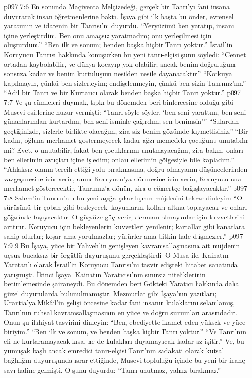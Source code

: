 \vs p097 7:6 En sonunda Maçiventa Melçizedeği, gerçek bir Tanrı’yı fani insana duyurarak insan öğretmenlerine baktı. İşaya gibi ilk başta bu önder, evrensel yaratımın ve idarenin bir Tanrısı’nı duyurdu. “Yeryüzünü ben yaratıp, insanı içine yerleştirdim. Ben onu amaçsız yaratmadım; onu yerleşilmesi için oluşturdum.” “Ben ilk ve sonum; benden başka hiçbir Tanrı yoktur.” İsrail’in Koruyucu Tanrısı hakkında konuşurken bu yeni tanrı\hyp{}elçisi şunu söyledi: “Cennet ortadan kaybolabilir, ve dünya kocayıp yok olabilir; ancak benim doğruluğum sonsuza kadar ve benim kurtuluşum nesilden nesile dayanacaktır.” “Korkuya kapılmayın, çünkü ben sizlerleyim; endişelenmeyin, çünkü ben sizin Tanrınız’ım.” “Adil bir Tanrı ve bir Kurtarıcı olarak benden başka hiçbir Tanrı yoktur.”
\vs p097 7:7 Ve şu cümleleri duymak, tıpkı bu dönemden beri binlercesine olduğu gibi, Musevi esirlerine huzur vermişti: “Tanrı söyle söyler, ‘ben seni yarattım, ben seni günahlarından kurtardım, ben seni isminle çağırdım; sen benimsin’” “Sulardan geçtiğinizde, sizlerle birlikte olacağım, zira siz benim gözümde kıymetlisiniz.” “Bir kadın, oğluna merhamet göstermeyecek kadar ağzı memedeki çocuğunu unutabilir mi? Evet, o unutabilir, fakat ben çocuklarımı unutmayacağım, zira bakın, onları ben ellerimin avuçları içine işledim; onları ellerimin gölgesiyle bile kapladım.” “Ahlaksız olanın tercih ettiği yolu bırakmasına, doğru olmayanın düşüncelerinden vazgeçmesine izin verin, onun Koruyucu’ya dönmesine izin verin, Koruyucu ona merhamet gösterecektir, Tanrımız’a dönün, zira o cömertçe bağışlayacaktır.”
\vs p097 7:8 Salem’in Tanrısı’nın bu yeni açığa çıkarılışının müjdesini tekrar dinleyin: “O sürüsünü bir çoban gibi besleyecek; koyunlarını kolları altına toplayacak ve onları göğsünde taşıyacaktır. O güçsüze güç verir, dermanı olmayanlar için kuvvetlerini arttırır. Koruyucu için bekleyenlerin kuvvetleri yenilenir; kartallar gibi kanatlara sahip olurlar; koşar ama yorulmazlar; yürürler ama bitkin hale düşmezler.”
\vs p097 7:9 9 Bu İşaya, yüce bir Yahveh’in genişleyen kavramsallaşmasına ait müjdenin uçsuz bucaksız bir örgütlü duyuruşunu gerçekleştirdi. O Musa ile, Kainatın Yaratan’ı olarak İsrail’in Koruyucu Tanrısı’nı tasvir edişteki hitabet sanatında yarışmıştı. İkinci İşaya, Kainatın Yaratıcısı’nın sınırsız niteliklerinin betimlemesinde şairaneydi. Bu dönemden beri Gökteki Yaratıcı hakkında daha güzel duyurularda bulunulmamıştır. Mezmurlar gibi İşaya’nın yazıtları; Urantia’ya Mikâil’in gelişi öncesine kadar fani insanın kulaklarını selamlamış, Tanrı’nın ruhsal kavramsallaşmasının en yüce ve doğru sunumları arasındadır. Onun şu ilahiyat tasvirini dinleyin: “Ben, ebediyette ikamet eden yüksek ve yüce biriyim.” “Ben ilk ve sonum, ve benden başka hiçbir Tanrı yoktur.” “Ve Tanrı’nın eli ne kurtaramayacak kısa, ne de kulakları duyamayacak kadar az işitir.” Ve, bu yumuşak başlı ancak emredici tanrı\hyp{}elçisi Tanrı’nın sadakati olarak kutsal bağlılığın duyuruşunda ısrar ettiğinde, Musevi topluluğu içinde bu yeni bir inanç savı haline gelmişti. O şunu duyurdu: “Tanrı unutmaz, yalnız bırakmaz.”
